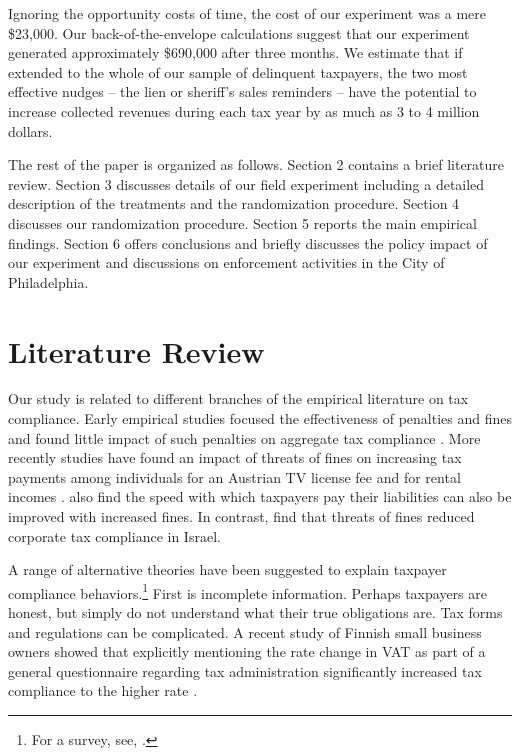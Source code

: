 \documentclass[12pt]{article}
\begin{document}
Ignoring the opportunity costs of time, the cost of our experiment was
a mere \$23,000.  Our back-of-the-envelope calculations suggest that
our experiment generated approximately \$690,000 after three
months. We estimate that if extended to the whole of our sample of
delinquent taxpayers, the two most effective nudges -- the lien or
sheriff's sales reminders -- have the potential to increase collected
revenues during each tax year by as much as 3 to 4 million dollars.

The rest of the paper is organized as follows. Section 2 contains a
brief literature review. Section 3 discusses details of our field
experiment including a detailed description of the treatments and the
randomization procedure. Section 4 discusses our randomization
procedure.  Section 5 reports the main empirical findings. Section 6
offers conclusions and briefly discusses the policy impact of our
experiment and discussions on enforcement activities in the City of
Philadelphia.
    

\section{Literature Review}

Our study is related to different branches of the empirical literature
on tax compliance. Early empirical studies focused the effectiveness
of penalties and fines and found little impact of such penalties on
aggregate tax compliance \cite{Slemrod-07}.  More recently studies
have found an impact of threats of fines on increasing tax payments
among individuals for an Austrian TV license fee \cite{Fellner-13} and
for rental incomes \cite{Wenzel-Taylor-04}.  
also find the speed with which taxpayers pay their liabilities can
also be improved with increased fines.  In contrast, 
find that threats of fines reduced corporate tax compliance in Israel.

A range of alternative theories have been suggested to explain
taxpayer compliance behaviors.\footnote{For a survey, see,
  .}  First is incomplete
information.  Perhaps taxpayers are honest, but simply do not
understand what their true obligations are. Tax forms and regulations
can be complicated.  A recent study of Finnish small business owners
showed that explicitly mentioning the rate change in VAT as part of a
general questionnaire regarding tax administration significantly
increased tax compliance to the higher rate .
\end{document}
